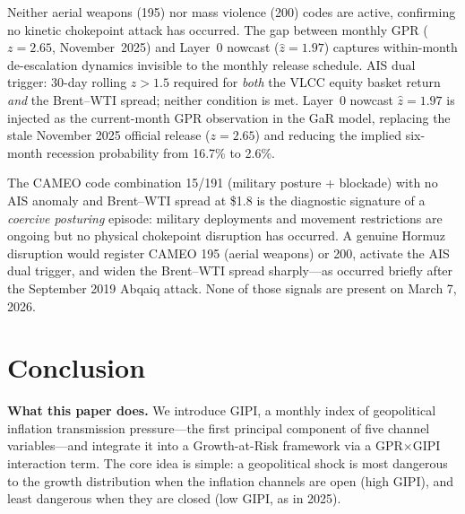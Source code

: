 \documentclass[12pt]{article}
\begin{document}
\begin{table}[htbp]
\begin{center}
\begin{threeparttable}
\begin{tablenotes}[flushleft]
Neither aerial weapons (195) nor mass violence (200) codes are active,
confirming no kinetic chokepoint attack has occurred.
The gap between monthly GPR ($z=2.65$, November~2025) and Layer~0 nowcast
($\hat{z}=1.97$) captures within-month de-escalation dynamics invisible
to the monthly release schedule.
AIS dual trigger: 30-day rolling $z > 1.5$ required for \textit{both}
the VLCC equity basket return \textit{and} the Brent--WTI spread; neither
condition is met.
Layer~0 nowcast $\hat{z}=1.97$ is injected as the current-month GPR observation
in the GaR model, replacing the stale November 2025 official release ($z=2.65$)
and reducing the implied six-month recession probability from 16.7\% to 2.6\%.
\end{tablenotes}
\end{threeparttable}
\end{center}
\end{table}

The CAMEO code combination 15/191 (military posture + blockade) with
no AIS anomaly and Brent--WTI spread at \$1.8 is the diagnostic signature
of a \textit{coercive posturing} episode: military deployments and
movement restrictions are ongoing but no physical chokepoint disruption
has occurred.
A genuine Hormuz disruption would register CAMEO 195 (aerial weapons)
or 200, activate the AIS dual trigger, and widen the Brent--WTI spread
sharply---as occurred briefly after the September 2019 Abqaiq attack.
None of those signals are present on March 7, 2026.

\section{Conclusion}\label{sec:conclude}

\noindent\textbf{What this paper does.}
We introduce GIPI, a monthly index of geopolitical inflation transmission
pressure---the first principal component of five channel variables---and
integrate it into a Growth-at-Risk framework via a GPR$\times$GIPI
interaction term.
The core idea is simple: a geopolitical shock is most dangerous to the
growth distribution when the inflation channels are open (high GIPI), and
least dangerous when they are closed (low GIPI, as in 2025).
\end{document}
